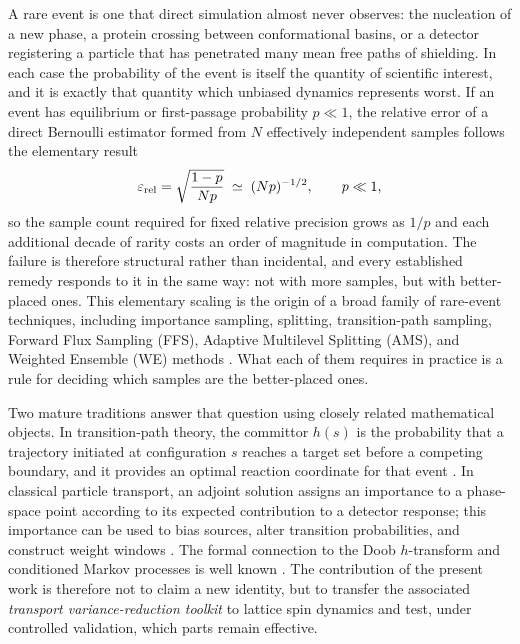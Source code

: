 \documentclass[a4paper,fleqn]{cas-sc}
\begin{document}
A rare event is one that direct simulation almost never observes: the nucleation of a new
phase, a protein crossing between conformational basins, or a detector registering a
particle that has penetrated many mean free paths of shielding. In each case the probability
of the event is itself the quantity of scientific interest, and it is exactly that quantity
which unbiased dynamics represents worst. If an event has equilibrium or first-passage
probability $p\ll1$, the relative error of a direct Bernoulli estimator formed from $N$
effectively independent samples follows the elementary result \citep{kahn1951,kalos2008}
\begin{equation}
\varepsilon_{\rm rel}=\sqrt{\frac{1-p}{Np}}\;\simeq\;(Np)^{-1/2},\qquad p\ll1,
\label{eq:bernoulli}
\end{equation}
so the sample count required for fixed relative precision grows as $1/p$ and each additional
decade of rarity costs an order of magnitude in computation. The failure is
therefore structural rather than incidental, and every established remedy responds to it in
the same way: not with more samples, but with better-placed ones. This elementary scaling is
the origin of a broad family of rare-event techniques, including importance sampling,
splitting, transition-path sampling, Forward Flux Sampling (FFS), Adaptive Multilevel
Splitting (AMS), and Weighted Ensemble (WE) methods \citep{kahn1951,kalos2008,huber1996,
zuckerman2017,allen2009,cerou2007,bolhuis2002}. What each of them requires in practice is a
rule for deciding which samples are the better-placed ones.

Two mature traditions answer that question using closely related mathematical objects. In
transition-path theory, the committor $h(s)$ is the probability that a trajectory initiated
at configuration $s$ reaches a target set before a competing boundary, and it provides an
optimal reaction coordinate for that event \citep{e2006,metzner2009,vandeneijnden2010}. In
classical particle transport, an adjoint solution assigns an importance to a phase-space
point according to its expected contribution to a detector response; this importance can be
used to bias sources, alter transition probabilities, and construct weight windows
\citep{lewins1965,spanier1969,bell1970,wagner1998,haghighat2003}. The formal connection to
the Doob $h$-transform and conditioned Markov processes is well known
\citep{doob1984,touchette2009,chetrite2015}. The contribution of the present work is
therefore not to claim a new identity, but to transfer the associated \emph{transport
variance-reduction toolkit} to lattice spin dynamics and test, under controlled validation,
which parts remain effective.
\end{document}
